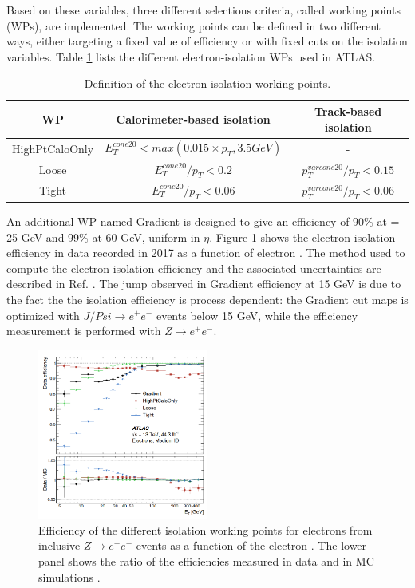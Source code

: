 Based on these variables, three different selections criteria, called working points (WPs), are implemented. The working points can be defined in two different ways, either targeting a fixed value of efficiency or with fixed cuts on the isolation variables. Table \ref{tab:chap2:Objects:Egamma:EIso:WPs} lists the different electron-isolation WPs used in ATLAS.
\begin{table}[H]
    \centering
    \begin{tabular}{ccc}
    \hline \hline
        WP & Calorimeter-based isolation & Track-based isolation \\ \hline 
        HighPtCaloOnly & $E^{cone20}_T < max(0.015\times p_T, 3.5 GeV)$ & - \\
        Loose & $E^{cone20}_T/p_T < 0.2$ & $p^{varcone20}_T/p_T < 0.15$ \\
        Tight & $E^{cone20}_T/p_T < 0.06$ & $p^{varcone20}_T/p_T < 0.06$ \\ \hline \hline
    \end{tabular}
    \caption{Definition of the electron isolation working points.}
    \label{tab:chap2:Objects:Egamma:EIso:WPs}
\end{table}
An additional WP named Gradient is designed to give an efficiency of 90\% at \pT = 25 GeV and 99\% at 60 GeV, uniform in $\eta$. Figure \ref{fig:chap2:Objects:Egamma:EIso:Eff} shows the electron isolation efficiency in data recorded in 2017 as a function of electron \eT \cite{Egamma_Perf_2017}. The method used to compute the electron isolation efficiency and the associated uncertainties are described in Ref. \cite{Electron_Reco_Id_Run1}. The jump observed in Gradient efficiency at 15 GeV is due to the fact the the isolation efficiency is process dependent: the Gradient cut maps is optimized with $J/Psi\rightarrow e^+e^-$ events below 15 GeV, while the efficiency measurement is performed with $Z\rightarrow e^+e^-$.
\begin{figure}[ht]
    \centering
    \includegraphics[width=0.5\textwidth]{Ch2/Img/Electron_Iso_Eff.png}
    \caption{Efficiency of the different isolation working points for electrons from inclusive $Z\rightarrow e^+e^-$ events as a function of the electron \eT. The lower panel shows the ratio of the efficiencies measured in data and in MC simulations \cite{Egamma_Perf_2017}.}
    \label{fig:chap2:Objects:Egamma:EIso:Eff}
\end{figure}
